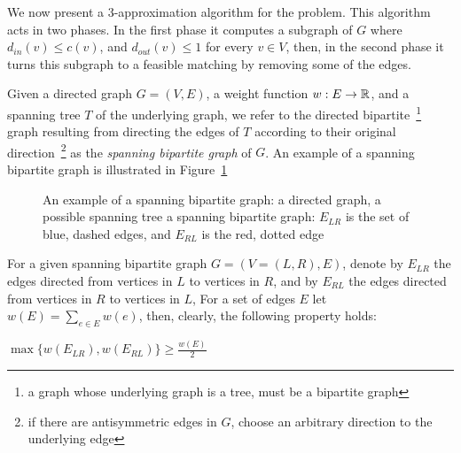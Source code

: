 \label{sub:cm}
We now present a 3-app\-roximation algorithm for the \textsc{\CARPOOL{}} problem.
This algorithm acts in two phases.
In the first phase it computes a subgraph of $G$ 
where $d_{in}(v) \leq c(v)$, and $d_{out}(v) \leq 1$ for every $v \in V$, 
then, in the second phase it turns this subgraph to a feasible matching
by removing some of the edges.

Given a directed graph $G = (V, E)$,
a weight function $w : E \rightarrow \mathbb{R}$, 
and a spanning tree $T$ of the underlying graph, 
we refer to the directed bipartite~\footnote{
a graph whose underlying graph is a tree, must be a bipartite graph}
graph resulting from directing the edges 
of $T$ according to their original direction~\footnote{
if there are antisymmetric edges in $G$, 
choose an arbitrary direction to the underlying edge}
as the \emph{spanning bipartite graph} of $G$.
An example of a spanning bipartite graph is illustrated in 
Figure~\ref{fig:spanning-bipartite-graph}

\begin{figure}
\centering

\caption{
\label{fig:spanning-bipartite-graph}
An example of a spanning bipartite graph:
 a directed graph, 
 a possible spanning tree  
 a spanning bipartite graph:
$E_{LR}$ is the set of blue, dashed edges, 
and $E_{RL}$ is the red, dotted edge   
}
\end{figure}

For a given spanning bipartite graph $G = (V = (L, R), E)$, 
denote by $E_{LR}$ the edges directed from vertices in $L$ to vertices in $R$,
and by $E_{RL}$ the edges directed from vertices in $R$ to vertices in $L$,
For a set of edges $E$ let $w(E) = \sum_{e \in E}{w(e)}$, 
then, clearly, the following property holds:

\begin{observation}
\label{ob:geq_half}
$ \max\{w(E_{LR}), w(E_{RL})\}  \geq \frac{w(E)}{2} $
\end{observation}


